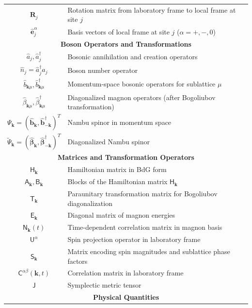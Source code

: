 \documentclass[aps, prx, nofootinbib, superscriptaddress]{revtex4-2}
\newcommand{\kvec}{\mathbf{k}}
\begin{document}
\begin{table}[!b]
\begin{tabular}{c|l}
    $\mathbf{R}_j$ & Rotation matrix from laboratory frame to local frame at site $j$ \\
    $\hat{\mathbf{e}}_j^{\alpha}$ & Basis vectors of local frame at site $j$ ($\alpha = +, -, 0$) \\
    \hline
    \multicolumn{2}{c}{\textbf{Boson Operators and Transformations}} \\
    \hline
    $\hat{a}_j, \hat{a}_j^{\dagger}$ & Bosonic annihilation and creation operators \\
    $\hat{n}_j = \hat{a}_j^{\dagger}\hat{a}_j$ & Boson number operator \\
    $\hat{b}_{\kvec\mu}, \hat{b}_{\kvec\mu}^{\dagger}$ & Momentum-space bosonic operators for sublattice $\mu$ \\
    $\hat{\beta}_{\kvec\mu}, \hat{\beta}_{\kvec\mu}^{\dagger}$ & Diagonalized magnon operators (after Bogoliubov transformation) \\
    $\Psi_{\kvec} = (\hat{\mathbf{b}}_{\kvec}, \hat{\mathbf{b}}_{-\kvec}^{\dagger})^T$ & Nambu spinor in momentum space \\
    $\widetilde{\Psi}_{\kvec} = (\hat{\boldsymbol{\beta}}_{\kvec}, \hat{\boldsymbol{\beta}}_{-\kvec}^{\dagger})^T$ & Diagonalized Nambu spinor \\
    \hline
    \multicolumn{2}{c}{\textbf{Matrices and Transformation Operators}} \\
    \hline
    $\mathsf{H}_{\kvec}$ & Hamiltonian matrix in BdG form \\
    $\mathsf{A}_{\kvec}, \mathsf{B}_{\kvec}$ & Blocks of the Hamiltonian matrix $\mathsf{H}_{\kvec}$ \\
    $\mathsf{T}_{\kvec}$ & Paraunitary transformation matrix for Bogoliubov diagonalization \\
    $\mathsf{E}_{\kvec}$ & Diagonal matrix of magnon energies \\
    $\mathsf{N}_{\kvec}(t)$ & Time-dependent correlation matrix in magnon basis \\
    $\mathsf{U}^{\alpha}$ & Spin projection operator in laboratory frame \\
    $\mathsf{S}_{\kvec}$ & Matrix encoding spin magnitudes and sublattice phase factors \\
    $\mathsf{C}^{\alpha\beta}(\kvec, t)$ & Correlation matrix in laboratory frame \\
    $\mathsf{J}$ & Symplectic metric tensor \\
    \hline
    \multicolumn{2}{c}{\textbf{Physical Quantities}} \\

\end{tabular}
\end{table}
\end{document}

